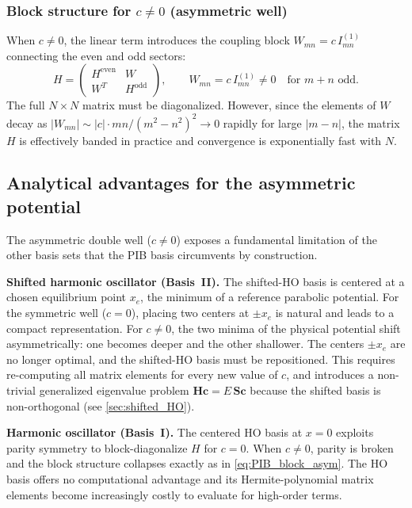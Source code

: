 \subsubsection{Block structure for $c \neq 0$ (asymmetric well)}

When $c \neq 0$, the linear term introduces the coupling block
$W_{mn} = c\,I_{mn}^{(1)}$ connecting the even and odd sectors:
\begin{equation}\label{eq:PIB_block_asym}
  H =
  \begin{pmatrix}
    H^{\text{even}} & W \\
    W^T & H^{\text{odd}}
  \end{pmatrix}\!,\qquad W_{mn} = c\,I_{mn}^{(1)}\neq 0\quad\text{for }m+n\text{ odd.}
\end{equation}
The full $N\times N$ matrix must be diagonalized.  However, since the elements
of $W$ decay as $|W_{mn}| \sim |c|\cdot mn/(m^2-n^2)^2 \to 0$ rapidly for
large $|m-n|$, the matrix $H$ is effectively banded in practice and convergence
is exponentially fast with $N$.

\subsection{Analytical advantages for the asymmetric potential}\label{sec:PIB_asym}

The asymmetric double well ($c \neq 0$) exposes a fundamental limitation of
the other basis sets that the PIB basis circumvents by construction.

\textbf{Shifted harmonic oscillator (Basis~II).}
The shifted-HO basis is centered at a chosen equilibrium point $x_e$, the
minimum of a reference parabolic potential.  For the symmetric well ($c = 0$),
placing two centers at $\pm x_e$ is natural and leads to a compact representation.
For $c \neq 0$, the two minima of the physical potential shift asymmetrically:
one becomes deeper and the other shallower.  The centers $\pm x_e$ are no
longer optimal, and the shifted-HO basis must be repositioned.  This requires
re-computing all matrix elements for every new value of $c$, and introduces
a non-trivial generalized eigenvalue problem $\mathbf{H}\mathbf{c} =
E\,\mathbf{S}\mathbf{c}$ because the shifted basis is non-orthogonal
(see \cref{sec:shifted_HO}).

\textbf{Harmonic oscillator (Basis~I).}
The centered HO basis at $x = 0$ exploits parity symmetry to block-diagonalize
$H$ for $c = 0$.  When $c \neq 0$, parity is broken and the block structure
collapses exactly as in \cref{eq:PIB_block_asym}.  The HO basis offers no
computational advantage and its Hermite-polynomial matrix elements become
increasingly costly to evaluate for high-order terms.

